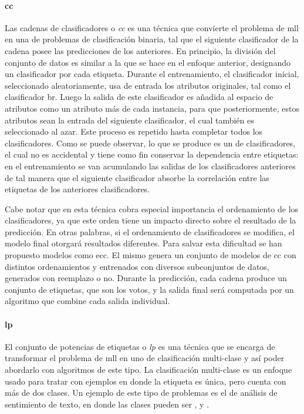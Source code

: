 \paragraph{\acrfull{cc}}

Las cadenas de clasificadores o \textit{\acrlong{cc}}
\cite{read_classifier_2011} es una técnica que convierte el problema de
\acrshort{mll} en una  de problemas de clasificación binaria,
tal que el siguiente clasificador de la cadena posee las predicciones de los
anteriores. En principio, la división del conjunto de datos es similar a la que
se hace en el enfoque anterior, designando un clasificador por cada etiqueta.
Durante el entrenamiento, el clasificador inicial, seleccionado aleatoriamente,
usa de entrada los atributos originales, tal como el clasificador \acrshort{br}.
Luego la salida de este clasificador es añadida al espacio de atributos como un
atributo más de cada instancia, para que posteriormente, estos atributos sean la
entrada del siguiente clasificador, el cual también es seleccionado al azar.
Este proceso es repetido hasta completar todos los clasificadores.  Como se
puede observar, lo que se produce es un  de
clasificadores, el cual no es accidental y tiene como fin conservar la
dependencia entre etiquetas: en el entrenamiento se van acumulando las salidas
de los clasificadores anteriores de tal manera que el siguiente clasificador
absorbe la correlación entre las etiquetas de los anteriores clasificadores.

Cabe notar que en esta técnica cobra especial importancia el ordenamiento de los
clasificadores, ya que este orden tiene un impacto directo sobre el resultado de
la predicción. En otras palabras, si el ordenamiento de clasificadores se
modifica, el modelo final otorgará resultados diferentes. Para salvar esta
dificultad se han propuesto modelos como \acrfull{ecc}. El mismo genera un
conjunto de modelos de \acrshort{cc} con distintos ordenamientos y entrenados
con diversos subconjuntos de datos, generados con reemplazo o no. Durante la
predicción, cada cadena produce un conjunto de etiquetas, que son los votos, y
la salida final será computada por un algoritmo que combine cada salida
individual.

\paragraph{\acrfull{lp}}

El conjunto de potencias de etiquetas o \textit{\acrlong{lp}}
\cite{tsoumakas_random_2011} es una técnica que se encarga de transformar el
problema de \acrshort{mll} en uno de clasificación multi-clase y así poder
abordarlo con algoritmos de este tipo. La clasificación multi-clase es un
enfoque usado para tratar con ejemplos en donde la etiqueta es única, pero cuenta
con más de dos clases. Un ejemplo de este tipo de problemas es el de análisis de
sentimiento de texto, en donde las clases pueden ser ,
 y .

